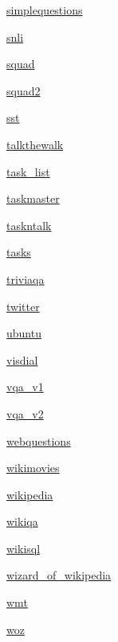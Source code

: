 \begin{DoxyCompactItemize}
 \hyperlink{namespaceparlai_1_1tasks_1_1simplequestions}{simplequestions}
\item 
 \hyperlink{namespaceparlai_1_1tasks_1_1snli}{snli}
\item 
 \hyperlink{namespaceparlai_1_1tasks_1_1squad}{squad}
\item 
 \hyperlink{namespaceparlai_1_1tasks_1_1squad2}{squad2}
\item 
 \hyperlink{namespaceparlai_1_1tasks_1_1sst}{sst}
\item 
 \hyperlink{namespaceparlai_1_1tasks_1_1talkthewalk}{talkthewalk}
\item 
 \hyperlink{namespaceparlai_1_1tasks_1_1task__list}{task\+\_\+list}
\item 
 \hyperlink{namespaceparlai_1_1tasks_1_1taskmaster}{taskmaster}
\item 
 \hyperlink{namespaceparlai_1_1tasks_1_1taskntalk}{taskntalk}
\item 
 \hyperlink{namespaceparlai_1_1tasks_1_1tasks}{tasks}
\item 
 \hyperlink{namespaceparlai_1_1tasks_1_1triviaqa}{triviaqa}
\item 
 \hyperlink{namespaceparlai_1_1tasks_1_1twitter}{twitter}
\item 
 \hyperlink{namespaceparlai_1_1tasks_1_1ubuntu}{ubuntu}
\item 
 \hyperlink{namespaceparlai_1_1tasks_1_1visdial}{visdial}
\item 
 \hyperlink{namespaceparlai_1_1tasks_1_1vqa__v1}{vqa\+\_\+v1}
\item 
 \hyperlink{namespaceparlai_1_1tasks_1_1vqa__v2}{vqa\+\_\+v2}
\item 
 \hyperlink{namespaceparlai_1_1tasks_1_1webquestions}{webquestions}
\item 
 \hyperlink{namespaceparlai_1_1tasks_1_1wikimovies}{wikimovies}
\item 
 \hyperlink{namespaceparlai_1_1tasks_1_1wikipedia}{wikipedia}
\item 
 \hyperlink{namespaceparlai_1_1tasks_1_1wikiqa}{wikiqa}
\item 
 \hyperlink{namespaceparlai_1_1tasks_1_1wikisql}{wikisql}
\item 
 \hyperlink{namespaceparlai_1_1tasks_1_1wizard__of__wikipedia}{wizard\+\_\+of\+\_\+wikipedia}
\item 
 \hyperlink{namespaceparlai_1_1tasks_1_1wmt}{wmt}
\item 
 \hyperlink{namespaceparlai_1_1tasks_1_1woz}{woz}
\end{DoxyCompactItemize}
